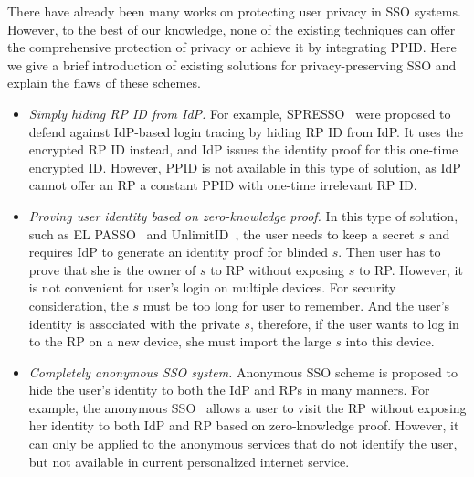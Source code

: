 There have already been many works on protecting user privacy in SSO systems. 
However, to the best of our knowledge, none of the existing techniques can offer the comprehensive protection of privacy or achieve it by integrating PPID. 
Here we give a brief introduction of existing solutions for privacy-preserving SSO and explain the flaws of these schemes. 
\begin{itemize}
\item {\em Simply hiding RP ID from IdP. }For example, SPRESSO~\cite{SPRESSO} were proposed to defend against IdP-based login tracing by hiding RP ID from IdP. It uses the encrypted RP ID instead, and IdP issues the identity proof for this one-time encrypted ID. However, PPID is not available in this type of solution, as IdP cannot offer an RP a constant PPID with one-time irrelevant RP ID.
\item {\em Proving user identity based on zero-knowledge proof. }In this type of solution, such as EL PASSO~\cite{ZhangKSZR21} and UnlimitID~\cite{IsaakidisHD16}, the user needs to keep a secret $s$ and requires IdP to generate an identity proof for blinded $s$. Then user has to prove that she is the owner of $s$ to RP without exposing $s$ to RP. However, it is not convenient for user's login on multiple devices. For security consideration, the $s$ must be too long for user to remember.  And the user's identity is associated with the private $s$, therefore, if the user wants to log in to the RP on a new device, she must import the large $s$ into this device. 
\item {\em Completely anonymous SSO system. }Anonymous SSO scheme is proposed to hide the user's identity to both the IdP and RPs in many manners. For example, the anonymous SSO~\cite{HanCSTW18} allows a user to visit the RP without exposing her identity to both IdP and RP based on zero-knowledge proof. However, it can only be applied to the anonymous services that do not identify the user, but not available in current personalized internet service.
\end{itemize}



